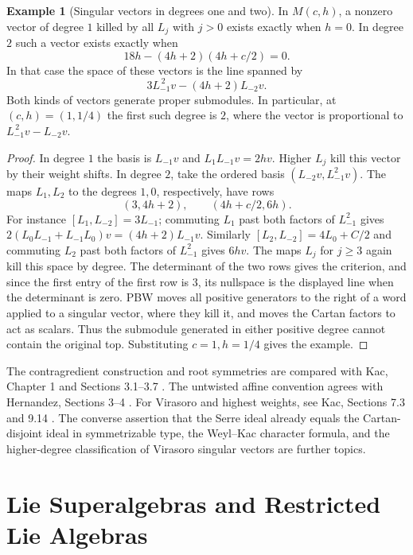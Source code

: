 \documentclass[11pt,oneside,openany]{book}
\theoremstyle{definition}
\newtheorem{example}[theorem]{Example}
\theoremstyle{remark}
\begin{document}
\begin{example}[Singular vectors in degrees one and two]
\label{res:KM14}
In \(M(c,h)\), a nonzero vector of degree \(1\) killed by all
\(L_j\) with \(j>0\) exists exactly when \(h=0\). In degree \(2\)
such a vector exists exactly when
\[
 18h-(4h+2)(4h+c/2)=0 .
\]
In that case the space of these vectors is the line spanned by
\[
 3 L_{-1}^{\,2}v-(4h+2)L_{-2}v .
\]
Both kinds of vectors generate proper submodules. In particular,
at \((c,h)=(1,1/4)\) the first such degree is \(2\), where the
vector is proportional to \(L_{-1}^{\,2}v-L_{-2}v\).
\end{example}

\begin{proof}
In degree \(1\) the basis is \(L_{-1}v\) and \(L_1L_{-1}v=2hv\).
Higher \(L_j\) kill this vector by their weight shifts.
In degree \(2\), take the ordered basis
\((L_{-2}v,L_{-1}^2v)\). The maps \(L_1,L_2\) to the
degrees \(1,0\), respectively, have rows
\[
 (3,4h+2), \qquad (4h+c/2,6h).
\]
For instance \([L_1,L_{-2}]=3L_{-1}\);
commuting \(L_1\) past both factors of \(L_{-1}^2\)
gives \(2(L_0L_{-1}+L_{-1}L_0)v=(4h+2)L_{-1}v\).
Similarly \([L_2,L_{-2}]=4L_0+C/2\) and commuting
\(L_2\) past both factors of \(L_{-1}^2\) gives \(6hv\).
The maps \(L_j\) for \(j\ge3\) again kill this space by degree.
The determinant of the two rows gives the criterion, and since
the first entry of the first row is \(3\), its nullspace is the
displayed line when the determinant is zero.
PBW moves all positive generators to the right of a word
applied to a singular vector, where they kill it, and moves
the Cartan factors to act as scalars. Thus the submodule generated
in either positive degree cannot contain the original top.
Substituting \(c=1,h=1/4\) gives the example.
\end{proof}

The contragredient construction and root symmetries are compared with
Kac, Chapter 1 and Sections 3.1--3.7 \cite{kac}.
The untwisted affine convention agrees with Hernandez,
Sections 3--4 \cite{hernandez-affine}. For Virasoro and highest
weights, see Kac, Sections 7.3 and 9.14 \cite{kac}.
The converse assertion that the Serre ideal already equals the
Cartan-disjoint ideal in symmetrizable type, the Weyl--Kac character
formula, and the higher-degree classification of Virasoro singular
vectors are further topics.
\chapter{Lie Superalgebras and Restricted Lie Algebras}
\end{document}
